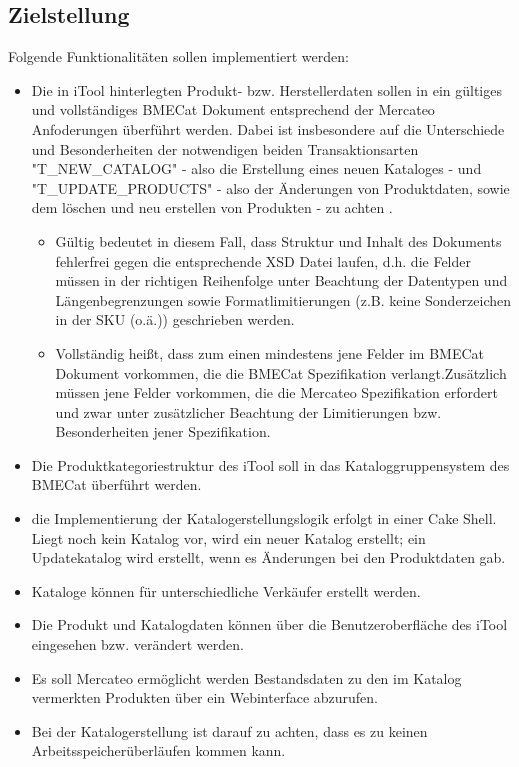 	\subsection{Zielstellung}
	
	Folgende Funktionalitäten sollen implementiert werden:
	
	\begin{itemize}
	\item Die in iTool hinterlegten Produkt- bzw. Herstellerdaten sollen in ein gültiges und vollständiges BMECat Dokument entsprechend der Mercateo Anfoderungen überführt werden. Dabei ist insbesondere auf die Unterschiede und Besonderheiten der notwendigen beiden Transaktionsarten "T\_NEW\_CATALOG" - also die Erstellung eines neuen Kataloges - und "T\_UPDATE\_PRODUCTS" - also der Änderungen von Produktdaten, sowie dem löschen und neu erstellen von Produkten - zu achten .
		\begin{itemize}
		\item Gültig bedeutet in diesem Fall, dass Struktur und Inhalt des Dokuments fehlerfrei gegen die entsprechende XSD Datei laufen, d.h. die Felder müssen in der richtigen Reihenfolge unter Beachtung der Datentypen und Längenbegrenzungen sowie Formatlimitierungen (z.B. keine Sonderzeichen in der SKU (o.ä.)) geschrieben werden.
		\item Vollständig heißt, dass zum einen mindestens jene Felder im BMECat Dokument vorkommen, die die BMECat Spezifikation verlangt.Zusätzlich müssen jene Felder vorkommen, die die Mercateo Spezifikation erfordert und zwar unter zusätzlicher Beachtung der Limitierungen bzw. Besonderheiten jener Spezifikation. 	
		\end{itemize}
		
	\item Die Produktkategoriestruktur des iTool soll in das Kataloggruppensystem des BMECat überführt werden.
	\item die Implementierung der Katalogerstellungslogik erfolgt in einer Cake Shell. Liegt noch kein Katalog vor, wird ein neuer Katalog erstellt; ein Updatekatalog wird erstellt, wenn es Änderungen bei den Produktdaten gab. 
	\item Kataloge können für unterschiedliche Verkäufer erstellt werden.
	\item Die Produkt und Katalogdaten können über die Benutzeroberfläche des iTool eingesehen bzw. verändert werden. 
	\item Es soll Mercateo ermöglicht werden Bestandsdaten zu den im Katalog vermerkten Produkten über ein Webinterface abzurufen.
	\item Bei der Katalogerstellung ist darauf zu achten, dass es zu keinen Arbeitsspeicherüberläufen kommen kann.
	\end{itemize}
	

	
	

